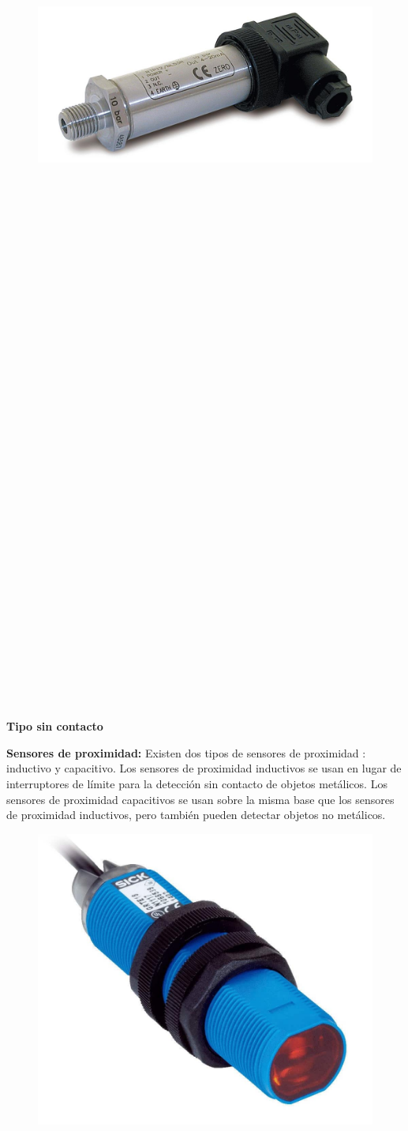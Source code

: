 \begin{figure}[h]
	\centering
	\includegraphics[width=0.4\linewidth, height=0.2\textwidth]{img/transductorpresion}
	\caption{}
	\label{fig:transductorpresion}
\end{figure} 
\textbf{}\\\\\\\\\\\\\\\\\\\\\\\\\\\\\\\\\\\\\\\\\\\\\\\\\\\\\\\\\\\\\\\\\\\\\\
\textbf{Tipo sin contacto }

\textbf{Sensores de proximidad: }
Existen dos tipos de sensores de proximidad : inductivo y capacitivo. Los sensores de proximidad inductivos se usan en lugar de interruptores de límite para la detección sin contacto de objetos metálicos. Los sensores de proximidad capacitivos se usan sobre la misma base que los sensores de proximidad inductivos, pero también pueden detectar objetos no metálicos.



\begin{figure}[h]
	\centering
	\includegraphics[width=0.4\linewidth, height=0.2\textwidth]{img/proximidad}
	\caption{}
	\label{fig:proximidad}
\end{figure} 


